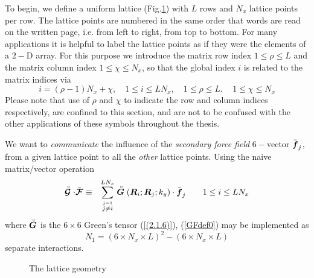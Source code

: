 To begin, we define a  uniform lattice (Fig.\ref{lattice})
with $L$ rows and ${N}_{x}$ lattice 
points per row.
The lattice points are numbered in the 
same order that words are read on the written page, 
i.e. from left to right, from top to bottom.
 For many applications it is helpful to label the lattice 
points as if they were the elements of a $2-$D array. For this purpose we 
introduce the matrix row index $1\le \rho \le L$ and the matrix column 
index $1 \le \chi \le N_x$, so that the global index $i$ is related to 
the matrix indices via
\[
i=(\rho -1) N_x + \chi, \quad 1 \le i \le L N_x, 
\quad 1 \le \rho \le L, \quad 1 \le \chi \le N_x
\] 
Please note that use of $\rho$ and $\chi$ to indicate the row and column 
indices respectively, are confined to this section, and are not to 
be confused with the other applications of these symbols throughout the thesis.


We want to {\em 
communicate\/} the influence of the {\em secondary force field\/} $6-$vector
 $\bar{\mbox{\boldmath$\mit f$\unboldmath}}_{ j}$, from a given lattice point 
to all the {\em other\/} lattice points.
Using the naive matrix/vector operation
\begin{eqnarray} \label{GFdef0}
\stackrel{\scriptscriptstyle _{\,\,\circ}}{ \mbox{\boldmath$\cal G$\unboldmath}} \cdot \bar{\mbox{\boldmath$\cal F$\unboldmath}} &\equiv& \sum\limits_{ \stackrel{j= 1}{j\not= i}}^{ 
L{N}_{x}} \stackrel{\scriptscriptstyle _{\,\,\circ}}{ \mbox{\boldmath$\mit G$\unboldmath}}({\mbox{\boldmath$\mit R$\unboldmath}}_{i};{\mbox{\boldmath$\mit R$\unboldmath}}_{j};{k}_{y}) \cdot \bar{\mbox{\boldmath$\mit f$\unboldmath}}_{ j}
\qquad 1\le  i \le L{N}_{x}
\end{eqnarray} 
where   $\stackrel{\scriptscriptstyle _{\,\,\circ}}{ \mbox{\boldmath$\mit G$\unboldmath}}$ is the $6 \times 6$ Green's 
tensor (\ref{(2.1.6)}), (\ref{GFdef0}) may be implemented as
\[
N_1=(6 \times {N}_{x} \times 
L)^2 - (6 \times {N}_{x} \times L)
\]
separate interactions.


\begin{figure}
\HideDisplacementBoxes
\centerline{}
\caption{The lattice geometry}
\protect\label{lattice}
\end{figure}

